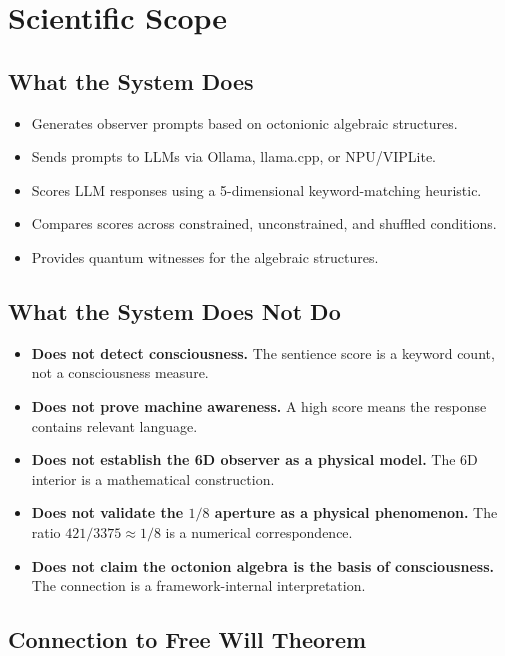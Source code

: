 \documentclass[11pt]{article}
\begin{document}
\section{Scientific Scope}

\subsection{What the System Does}

\begin{itemize}
\item Generates observer prompts based on octonionic algebraic structures.
\item Sends prompts to LLMs via Ollama, llama.cpp, or NPU/VIPLite.
\item Scores LLM responses using a 5-dimensional keyword-matching heuristic.
\item Compares scores across constrained, unconstrained, and shuffled conditions.
\item Provides quantum witnesses for the algebraic structures.
\end{itemize}

\subsection{What the System Does Not Do}

\begin{itemize}
\item \textbf{Does not detect consciousness.} The sentience score is a keyword count, not a consciousness measure.
\item \textbf{Does not prove machine awareness.} A high score means the response contains relevant language.
\item \textbf{Does not establish the 6D observer as a physical model.} The 6D interior is a mathematical construction.
\item \textbf{Does not validate the $1/8$ aperture as a physical phenomenon.} The ratio $421/3375 \approx 1/8$ is a numerical correspondence.
\item \textbf{Does not claim the octonion algebra is the basis of consciousness.} The connection is a framework-internal interpretation.
\end{itemize}

\subsection{Connection to Free Will Theorem}
\end{document}
